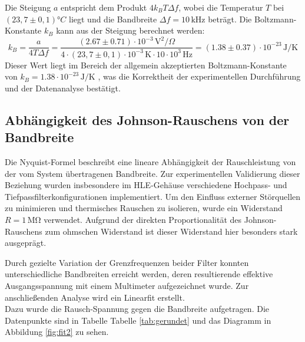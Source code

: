 Die Steigung $a$ entspricht dem Produkt $4 k_B T \Delta f$, wobei die Temperatur $T$ bei $(23,7 \pm 0,1) °C$ liegt und die Bandbreite $\Delta f = 10\,\mathrm{kHz}$ beträgt. Die Boltzmann-Konstante $k_B$ kann aus der Steigung berechnet werden:
\begin{equation}
k_B = \frac{a}{4 T \Delta f} = \frac{(2.67 \pm 0.71) \cdot 10^{-3} \,\mathrm{V}^2/\Omega}{4 \cdot (23,7 \pm 0,1) \cdot 10^{-3} \,\mathrm{K} \cdot 10 \cdot 10^3 \,\mathrm{Hz}} = (1.38 \pm 0.37) \cdot 10^{-23} \,\mathrm{J/K}
\end{equation}
Dieser Wert liegt im Bereich der allgemein akzeptierten Boltzmann-Konstante von $k_B = 1.38 \cdot 10^{-23} \,\mathrm{J/K}$ \cite{} %
, was die Korrektheit der experimentellen Durchführung und der Datenanalyse bestätigt.
\subsection{Abhängigkeit des Johnson-Rauschens von der Bandbreite}

Die Nyquist-Formel beschreibt eine lineare Abhängigkeit der Rauschleistung von der vom System übertragenen Bandbreite. Zur experimentellen Validierung dieser Beziehung wurden insbesondere im HLE-Gehäuse verschiedene Hochpass- und Tiefpassfilterkonfigurationen implementiert. Um den Einfluss externer Störquellen zu minimieren und thermisches Rauschen zu isolieren, wurde ein Widerstand \(R = 1\,\mathrm{M\Omega} \) verwendet. Aufgrund der direkten Proportionalität des Johnson-Rauschens zum ohmschen Widerstand ist dieser Widerstand hier besonders stark ausgeprägt.

Durch gezielte Variation der Grenzfrequenzen beider Filter konnten unterschiedliche Bandbreiten erreicht werden, deren resultierende effektive Ausgangsspannung mit einem Multimeter aufgezeichnet wurde. Zur anschließenden Analyse wird ein Linearfit erstellt. \\
Dazu wurde die Rausch-Spannung gegen
die Bandbreite aufgetragen. Die Datenpunkte sind in Tabelle Tabelle \ref{tab:gerundet} und das Diagramm in Abbildung \ref{fig:fit2} zu sehen. \\


